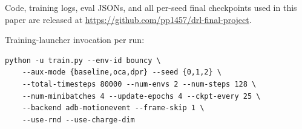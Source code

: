 \documentclass{article}
\begin{document}
Code, training logs, eval JSONs, and all per-seed final
checkpoints used in this paper are released at
\url{https://github.com/pp1457/drl-final-project}.

Training-launcher invocation per run:

\smallskip
\begin{verbatim}
python -u train.py --env-id bouncy \
    --aux-mode {baseline,oca,dpr} --seed {0,1,2} \
    --total-timesteps 80000 --num-envs 2 --num-steps 128 \
    --num-minibatches 4 --update-epochs 4 --ckpt-every 25 \
    --backend adb-motionevent --frame-skip 1 \
    --use-rnd --use-charge-dim
\end{verbatim}
\end{document}
